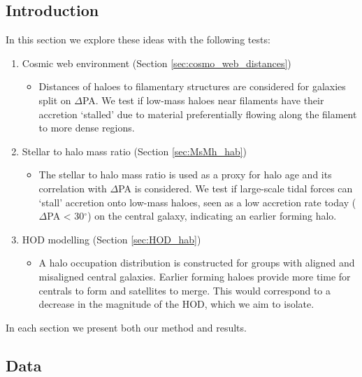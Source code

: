 \subsection{Introduction}
In this section we explore these ideas with the following tests:
\begin{enumerate}
\item Cosmic web environment (Section \ref{sec:cosmo_web_distances})
\begin{itemize}
\item Distances of haloes to filamentary structures are considered for galaxies split on $\Delta$PA. We test if low-mass haloes near filaments have their accretion `stalled' due to material preferentially flowing along the filament to more dense regions. 
\end{itemize}
\item Stellar to halo mass ratio  (Section \ref{sec:MsMh_hab})
\begin{itemize}
\item The stellar to halo mass ratio is used as a proxy for halo age and its correlation with $\Delta$PA is considered. We test if large-scale tidal forces can `stall' accretion onto low-mass haloes, seen as a low accretion rate today ($\Delta$PA < 30$^{\circ}$) on the central galaxy, indicating an earlier forming halo.
\end{itemize}
\item HOD modelling (Section \ref{sec:HOD_hab})
\begin{itemize}
\item A halo occupation distribution is constructed for groups with aligned and misaligned central galaxies. Earlier forming haloes provide more time for centrals to form and satellites to merge. This would correspond to a decrease in the magnitude of the HOD, which we aim to isolate. 
\end{itemize}
\end{enumerate}
In each section we present both our method and results.

\subsection{Data}

